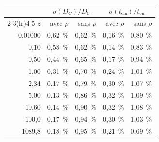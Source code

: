 \begin{center}
\renewcommand{\arraystretch}{1.2}
\begin{tabular}{rrrrr}
\toprule
& \multicolumn{2}{c}{$\sigma(D_{C})/D_{C}$} & \multicolumn{2}{c}{$\sigma(t_{\text{em}})/t_{\text{em}}$} \\
\cmidrule(lr){2-3}\cmidrule(lr){4-5}
$z$ & avec $\rho$ & sans $\rho$ & avec $\rho$ & sans $\rho$ \\
\midrule
0{,}01000 & 0{,}62~\% & 0{,}62~\% & 0{,}16~\% & 0{,}80~\% \\
0{,}10 & 0{,}58~\% & 0{,}62~\% & 0{,}14~\% & 0{,}83~\% \\
0{,}50 & 0{,}44~\% & 0{,}65~\% & 0{,}17~\% & 0{,}94~\% \\
1{,}00 & 0{,}31~\% & 0{,}70~\% & 0{,}24~\% & 1{,}01~\% \\
2{,}34 & 0{,}17~\% & 0{,}79~\% & 0{,}30~\% & 1{,}07~\% \\
5{,}00 & 0{,}13~\% & 0{,}86~\% & 0{,}32~\% & 1{,}09~\% \\
10{,}60 & 0{,}14~\% & 0{,}90~\% & 0{,}32~\% & 1{,}08~\% \\
100{,}0 & 0{,}17~\% & 0{,}94~\% & 0{,}30~\% & 1{,}03~\% \\
1089{,}8 & 0{,}18~\% & 0{,}95~\% & 0{,}21~\% & 0{,}69~\% \\
\bottomrule
\end{tabular}
\end{center}
